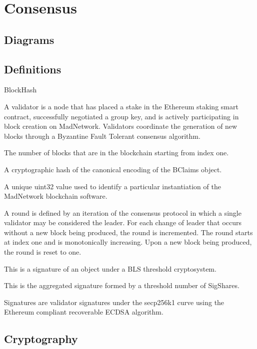 \section{Consensus}

\subsection{Diagrams}



\subsection{Definitions}

\begin{labeling}{BlockHash}
\item [Validator] A validator is a node that has placed a stake in the
    Ethereum staking smart contract, successfully negotiated a group key,
    and is actively participating in block creation on MadNetwork.
    Validators coordinate the generation of new blocks through a
    Byzantine Fault Tolerant consensus algorithm.
\item [Height]
    The number of blocks that are in the blockchain starting from index one.
\item [BlockHash] A cryptographic hash of the canonical encoding
    of the BClaims object.
\item [ChainID] A unique uint32 value used to identify a particular
    instantiation of the MadNetwork blockchain software.
\item [Round] A round is defined by an iteration of the consensus
    protocol in which a single validator may be considered the leader.
    For each change of leader that occurs without a new block being
    produced, the round is incremented.
    The round starts at index one and is monotonically increasing.
    Upon a new block being produced, the round is reset to one.
\item [SigShare] This is a signature of an object under a BLS threshold
    cryptosystem.
\item [SigGroup] This is the aggregated signature formed by a threshold
    number of SigShares.
\item [Signature] Signatures are validator signatures under the
    secp256k1 curve using the Ethereum compliant recoverable ECDSA algorithm.
\end{labeling}


\subsection{Cryptography}


